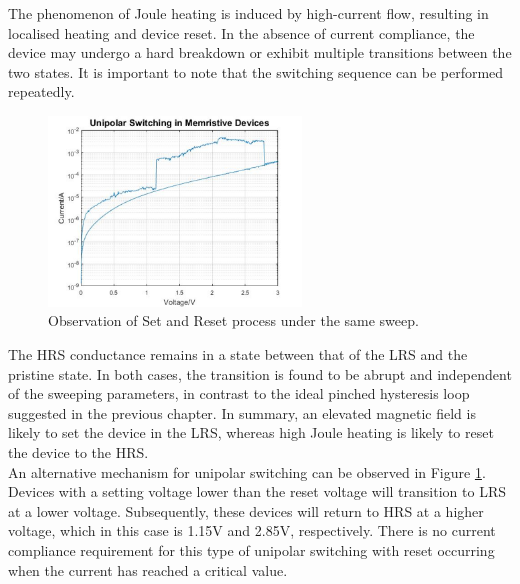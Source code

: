 \noindent The phenomenon of Joule heating is induced by high-current flow, resulting in localised heating and device reset. In the absence of current compliance, the device may undergo a hard breakdown or exhibit multiple transitions between the two states. It is important to note that the switching sequence can be performed repeatedly.\\ 

\begin{figure}[htbp!] 
    \centering    
    \includegraphics[width=0.6\textwidth]{Chapter3/Figs/i.png}
    \caption[Observation of Set and Reset process under the same sweep.]{Observation of Set and Reset process under the same sweep.}
    \label{fig:3i}
\end{figure}

\noindent The HRS conductance remains in a state between that of the LRS and the pristine state. In both cases, the transition is found to be abrupt and independent of the sweeping parameters, in contrast to the ideal pinched hysteresis loop suggested in the previous chapter. In summary, an elevated magnetic field is likely to set the device in the LRS, whereas high Joule heating is likely to reset the device to the HRS.\\


\noindent An alternative mechanism for unipolar switching can be observed in Figure \ref{fig:3i}. Devices with a setting voltage lower than the reset voltage will transition to LRS at a lower voltage. Subsequently, these devices will return to HRS at a higher voltage, which in this case is 1.15V and 2.85V, respectively. There is no current compliance requirement for this type of unipolar switching with reset occurring when the current has reached a critical value. \\


